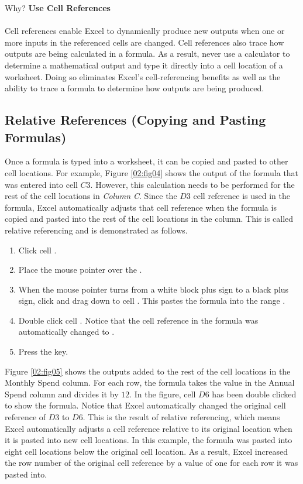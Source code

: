 \begin{center}
	\begin{infobox}{Why?}
		\textbf{Use Cell References}
		\\
		\\
		Cell references enable Excel to dynamically produce new outputs when one or more inputs in the referenced cells are changed. Cell references also trace how outputs are being calculated in a formula. As a result, never use a calculator to determine a mathematical output and type it directly into a cell location of a worksheet. Doing so eliminates Excel's cell-referencing benefits as well as the ability to trace a formula to determine how outputs are being produced.
	\end{infobox}
\end{center}

\subsection{Relative References (Copying and Pasting Formulas)}

Once a formula is typed into a worksheet, it can be copied and pasted to other cell locations. For example, Figure \ref{02:fig04} shows the output of the formula that was entered into cell $ C3 $. However, this calculation needs to be performed for the rest of the cell locations in \textit{Column C}. Since the $ D3 $ cell reference is used in the formula, Excel automatically adjusts that cell reference when the formula is copied and pasted into the rest of the cell locations in the column. This is called relative referencing and is demonstrated as follows.

\begin{enumerate}
	\item Click cell .
	\item Place the mouse pointer over the .
	\item When the mouse pointer turns from a white block plus sign to a black plus sign, click and drag down to cell . This pastes the formula into the range .
	\item Double click cell . Notice that the cell reference in the formula was automatically changed to .
	\item Press the  key.
\end{enumerate}

Figure \ref{02:fig05} shows the outputs added to the rest of the cell locations in the Monthly Spend column. For each row, the formula takes the value in the Annual Spend column and divides it by $ 12 $. In the figure, cell $ D6 $ has been double clicked to show the formula. Notice that Excel automatically changed the original cell reference of $ D3 $ to $ D6 $. This is the result of relative referencing, which means Excel automatically adjusts a cell reference relative to its original location when it is pasted into new cell locations. In this example, the formula was pasted into eight cell locations below the original cell location. As a result, Excel increased the row number of the original cell reference by a value of one for each row it was pasted into.


